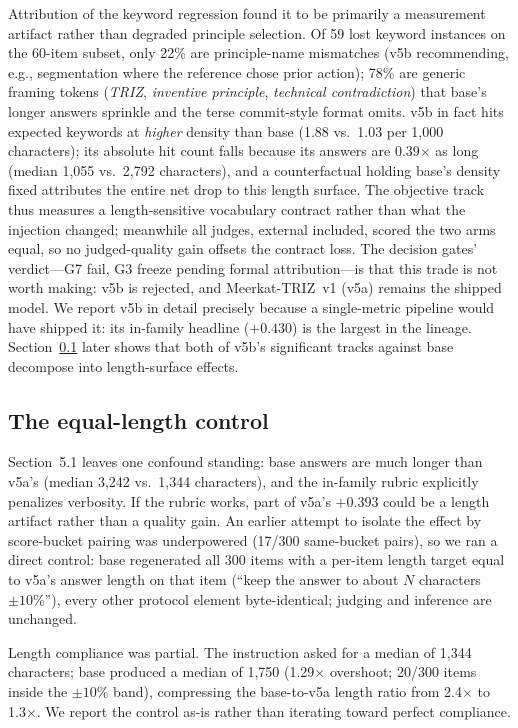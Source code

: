 \documentclass[11pt]{article}
\newcommand{\model}{Meerkat-TRIZ}
\begin{document}
Attribution of the keyword regression found it to be primarily a
measurement artifact rather than degraded principle selection. Of 59
lost keyword instances on the 60-item subset, only 22\% are
principle-name mismatches (v5b recommending, e.g., segmentation where
the reference chose prior action); 78\% are generic framing tokens
(\emph{TRIZ}, \emph{inventive principle}, \emph{technical
contradiction}) that base's longer answers sprinkle and the terse
commit-style format omits. v5b in fact hits expected keywords at
\emph{higher} density than base (1.88 vs.\ 1.03 per 1{,}000
characters); its absolute hit count falls because its answers are
0.39$\times$ as long (median 1{,}055 vs.\ 2{,}792 characters), and a
counterfactual holding base's density fixed attributes the entire net
drop to this length surface. The objective track thus measures a
length-sensitive vocabulary contract rather than what the injection
changed; meanwhile all judges, external included, scored the two arms
equal, so no judged-quality gain offsets the contract loss. The decision gates' verdict---G7 fail, G3
freeze pending formal attribution---is that this trade is not worth
making: v5b is rejected, and \model~v1 (v5a) remains the shipped model.
We report v5b in detail precisely because a single-metric pipeline
would have shipped it: its in-family headline ($+0.430$) is the largest
in the lineage. Section~\ref{sec:eqlen} later shows that both of v5b's
significant tracks against base decompose into length-surface effects.

\subsection{The equal-length control}
\label{sec:eqlen}
Section~5.1 leaves one confound standing: base answers are much longer
than v5a's (median 3{,}242 vs.\ 1{,}344 characters), and the in-family
rubric explicitly penalizes verbosity. If the rubric works, part of
v5a's $+0.393$ could be a length artifact rather than a quality gain.
An earlier attempt to isolate the effect by score-bucket pairing was
underpowered (17/300 same-bucket pairs), so we ran a direct control:
base regenerated all 300 items with a per-item length target equal to
v5a's answer length on that item (``keep the answer to about $N$
characters $\pm 10\%$''), every other protocol element byte-identical;
judging and inference are unchanged.

Length compliance was partial. The instruction asked for a median of
1{,}344 characters; base produced a median of 1{,}750 (1.29$\times$
overshoot; 20/300 items inside the $\pm 10\%$ band), compressing the
base-to-v5a length ratio from 2.4$\times$ to 1.3$\times$. We report
the control as-is rather than iterating toward perfect compliance.
\end{document}
